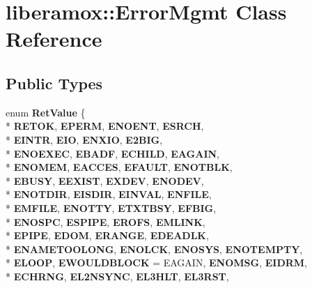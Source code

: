 \hypertarget{classliberamox_1_1ErrorMgmt}{}\section{liberamox\+:\+:Error\+Mgmt Class Reference}
\label{classliberamox_1_1ErrorMgmt}
\subsection*{Public Types}
\begin{DoxyCompactItemize}
\item 
enum {\bfseries Ret\+Value} \{ \\*
{\bfseries R\+E\+T\+OK}, 
{\bfseries E\+P\+E\+RM}, 
{\bfseries E\+N\+O\+E\+NT}, 
{\bfseries E\+S\+R\+CH}, 
\\*
{\bfseries E\+I\+N\+TR}, 
{\bfseries E\+IO}, 
{\bfseries E\+N\+X\+IO}, 
{\bfseries E2\+B\+IG}, 
\\*
{\bfseries E\+N\+O\+E\+X\+EC}, 
{\bfseries E\+B\+A\+DF}, 
{\bfseries E\+C\+H\+I\+LD}, 
{\bfseries E\+A\+G\+A\+IN}, 
\\*
{\bfseries E\+N\+O\+M\+EM}, 
{\bfseries E\+A\+C\+C\+ES}, 
{\bfseries E\+F\+A\+U\+LT}, 
{\bfseries E\+N\+O\+T\+B\+LK}, 
\\*
{\bfseries E\+B\+U\+SY}, 
{\bfseries E\+E\+X\+I\+ST}, 
{\bfseries E\+X\+D\+EV}, 
{\bfseries E\+N\+O\+D\+EV}, 
\\*
{\bfseries E\+N\+O\+T\+D\+IR}, 
{\bfseries E\+I\+S\+D\+IR}, 
{\bfseries E\+I\+N\+V\+AL}, 
{\bfseries E\+N\+F\+I\+LE}, 
\\*
{\bfseries E\+M\+F\+I\+LE}, 
{\bfseries E\+N\+O\+T\+TY}, 
{\bfseries E\+T\+X\+T\+B\+SY}, 
{\bfseries E\+F\+B\+IG}, 
\\*
{\bfseries E\+N\+O\+S\+PC}, 
{\bfseries E\+S\+P\+I\+PE}, 
{\bfseries E\+R\+O\+FS}, 
{\bfseries E\+M\+L\+I\+NK}, 
\\*
{\bfseries E\+P\+I\+PE}, 
{\bfseries E\+D\+OM}, 
{\bfseries E\+R\+A\+N\+GE}, 
{\bfseries E\+D\+E\+A\+D\+LK}, 
\\*
{\bfseries E\+N\+A\+M\+E\+T\+O\+O\+L\+O\+NG}, 
{\bfseries E\+N\+O\+L\+CK}, 
{\bfseries E\+N\+O\+S\+YS}, 
{\bfseries E\+N\+O\+T\+E\+M\+P\+TY}, 
\\*
{\bfseries E\+L\+O\+OP}, 
{\bfseries E\+W\+O\+U\+L\+D\+B\+L\+O\+CK} = E\+A\+G\+A\+IN, 
{\bfseries E\+N\+O\+M\+SG}, 
{\bfseries E\+I\+D\+RM}, 
\\*
{\bfseries E\+C\+H\+R\+NG}, 
{\bfseries E\+L2\+N\+S\+Y\+NC}, 
{\bfseries E\+L3\+H\+LT}, 
{\bfseries E\+L3\+R\+ST}, 

\end{DoxyCompactItemize}
